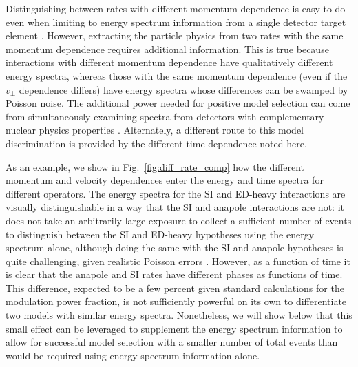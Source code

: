 \documentclass[11pt]{article}
\newcommand{\Fig}[1]{Fig.~\ref{#1}} \newcommand{\Figs}[2]{Figs.~\ref{#1} and \ref{#2}}
\begin{document}
Distinguishing between rates with different momentum dependence is easy to do even when limiting to energy spectrum information from a single detector target element \cite{Gluscevic:2015sqa}. However, extracting the particle physics from two rates with the same momentum dependence requires additional information. This is true because interactions with different momentum dependence have qualitatively different energy spectra, whereas those with the same momentum dependence (even if the $v_\perp$ dependence differs) have energy spectra whose differences can be swamped by Poisson noise. The additional power needed for positive model selection can come from simultaneously examining spectra from detectors with complementary nuclear physics properties \cite{Gluscevic:2015sqa}. Alternately, a different route to this model discrimination is provided by the different time dependence noted here.

As an example, we show in \Fig{fig:diff_rate_comp} how the different momentum and velocity dependences enter the energy and time spectra for different operators. The energy spectra for the SI and ED-heavy interactions are visually distinguishable in a way that the SI and anapole interactions are not: it does not take an arbitrarily large exposure to collect a sufficient number of events to distinguish between the SI and ED-heavy hypotheses using the energy spectrum alone, although doing the same with the SI and anapole hypotheses is quite challenging, given realistic Poisson errors \cite{Gluscevic:2015sqa}. However, as a function of time it is clear that the anapole and SI rates have different phases as functions of time. This difference, expected to be a few percent given standard calculations for the modulation power fraction, is not sufficiently powerful on its own to differentiate two models with similar energy spectra. Nonetheless, we will show below that this small effect can be leveraged to supplement the energy spectrum information to allow for successful model selection with a smaller number of total events than would be required using energy spectrum information alone.
\end{document}
